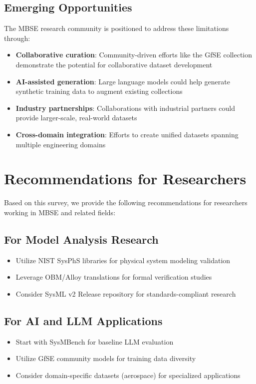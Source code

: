 \documentclass[11pt,a4paper]{article}
\begin{document}
\subsection{Emerging Opportunities}

The MBSE research community is positioned to address these limitations through:

\begin{itemize}[leftmargin=*]
    \item \textbf{Collaborative curation}: Community-driven efforts like the GfSE collection demonstrate the potential for collaborative dataset development
    \item \textbf{AI-assisted generation}: Large language models could help generate synthetic training data to augment existing collections
    \item \textbf{Industry partnerships}: Collaborations with industrial partners could provide larger-scale, real-world datasets
    \item \textbf{Cross-domain integration}: Efforts to create unified datasets spanning multiple engineering domains
\end{itemize}

\section{Recommendations for Researchers}

Based on this survey, we provide the following recommendations for researchers working in MBSE and related fields:

\subsection{For Model Analysis Research}
\begin{itemize}[leftmargin=*]
    \item Utilize NIST SysPhS libraries for physical system modeling validation
    \item Leverage OBM/Alloy translations for formal verification studies
    \item Consider SysML v2 Release repository for standards-compliant research
\end{itemize}

\subsection{For AI and LLM Applications}
\begin{itemize}[leftmargin=*]
    \item Start with SysMBench for baseline LLM evaluation
    \item Utilize GfSE community models for training data diversity
    \item Consider domain-specific datasets (aerospace) for specialized applications
\end{itemize}
\end{document}
